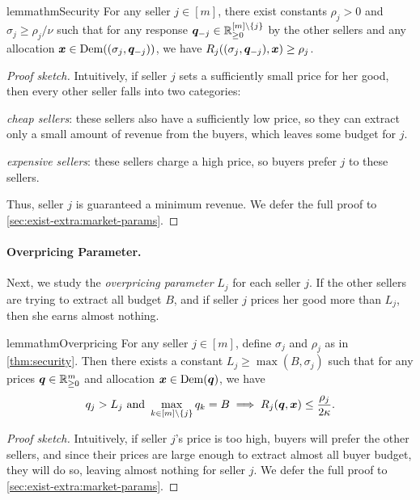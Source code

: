 \begin{restatable}{lemma}{thmSecurity}
\label{thm:security}
For any seller $j \in [m]$, there exist constants $\rho_j > 0$ and $\sigma_j \ge \rho_j/\nu$ such that
for any response $\bm{q}_{-j} \in \mathbb{R}_{\ge 0}^{[m]\setminus\{j\}}$ by the other sellers
and any allocation $\bm{x} \in \operatorname{Dem}((\sigma_j, \bm{q}_{-j}))$, we have
$R_j((\sigma_j, \bm{q}_{-j}), \bm{x}) \ge \rho_j$.
\end{restatable}
\begin{proof}[Proof sketch]
Intuitively, if seller $j$ sets a sufficiently small price for her good,
then every other seller falls into two categories:
\begin{tightenum}
\item \emph{cheap sellers}: these sellers also have a sufficiently low price,
    so they can extract only a small amount of revenue from the buyers,
    which leaves some budget for $j$.
\item \emph{expensive sellers}: these sellers charge a high price, so buyers prefer $j$ to these sellers.
\end{tightenum}
Thus, seller $j$ is guaranteed a minimum revenue.
We defer the full proof to \cref{sec:exist-extra:market-params}.
\end{proof}

\paragraph{Overpricing Parameter.}
Next, we study the \emph{overpricing parameter} $L_j$ for each seller $j$.
If the other sellers are trying to extract all budget $B$,
and if seller $j$ prices her good more than $L_j$, then she earns almost nothing.

\begin{restatable}{lemma}{thmOverpricing}
\label{thm:overpricing}
For any seller $j \in [m]$, define $\sigma_j$ and $\rho_j$ as in \cref{thm:security}.
Then there exists a constant $L_j \ge \max(B, \sigma_j)$ such that
for any prices $\bm{q} \in \mathbb{R}_{\ge 0}^m$ and allocation $\bm{x} \in \operatorname{Dem}(\bm{q})$, we have
\[ q_j > L_j \text{ and } \max_{k \in [m] \setminus \{j\}} q_k = B
    \implies R_j(\bm{q}, \bm{x}) \le \frac{\rho_j}{2\kappa}. \]
\end{restatable}
\begin{proof}[Proof sketch]
Intuitively, if seller $j$'s price is too high, buyers will prefer the other sellers,
and since their prices are large enough to extract almost all buyer budget,
they will do so, leaving almost nothing for seller $j$.
We defer the full proof to \cref{sec:exist-extra:market-params}.
\end{proof}

